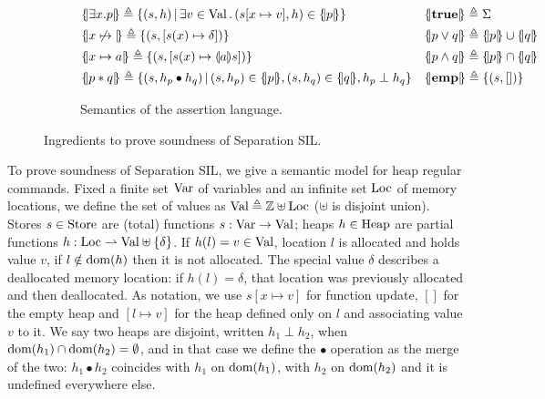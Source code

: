 \begin{figure}[t]
\begin{subfigure}[t]{\linewidth}
\begin{align*}
			 & \asldenot{\exists x. p} \eqdef \{ (s, h) \svert \exists v \in \Val \sdot (s[x \mapsto v], h) \in \asldenot{p} \}                   &  & \asldenot{\true} \eqdef \Sigma                             \\
			 & \asldenot{x \dealloc} \eqdef \{ (s, [s(x) \mapsto \delta]) \}                                                                      &  & \asldenot{p \lor q} \eqdef \asldenot{p} \cup \asldenot{q}  \\
			 & \asldenot{x \mapsto a} \eqdef \{ (s, [s(x) \mapsto \edenot{a} s]) \}                                                               &  & \asldenot{p \land q} \eqdef \asldenot{p} \cap \asldenot{q} \\
			 & \asldenot{p \andsep q} \eqdef \{ (s, h_p \bullet h_q) \svert (s, h_p) \in \asldenot{p}, (s,h_q) \in \asldenot{q}, h_p \perp h_q \} &  & \asldenot{\emp} \eqdef \{ (s, []) \}
		\end{align*}
		\caption{Semantics of the assertion language.}
		\label{fig:sil:ssil-model-assertions}
	\end{subfigure}
	\caption{Ingredients to prove soundness of Separation SIL.}
\end{figure}

To prove soundness of Separation SIL, we give a semantic model for heap regular commands.
Fixed a finite set $\text{Var}$ of variables and an infinite set $\text{Loc}$ of memory locations, we define the set of values as $\text{Val} \triangleq \mathbb{Z} \uplus \text{Loc}$ ($\uplus$ is disjoint union).
Stores $s \in \text{Store}$ are (total) functions $s: \text{Var} \rightarrow \text{Val}$; heaps $h \in \text{Heap}$ are partial functions $h: \text{Loc} \rightharpoonup \text{Val} \uplus \{ \delta \}$. If $h(l) = v \in \text{Val}$, location $l$ is allocated and holds value $v$, if $l \notin \text{dom}(h)$ then it is not allocated. The special value $\delta$ describes a deallocated memory location: if $h(l) = \delta$, that location was previously allocated and then deallocated.
As notation, we use $s[x \mapsto v]$ for function update, $[]$ for the empty heap and $[l \mapsto v]$ for the heap defined only on $l$ and associating value $v$ to it.
We say two heaps are disjoint, written $h_1 \perp h_2$, when $\text{dom}(h_1) \cap \text{dom}(h_2) = \emptyset$, and in that case we define the $\bullet$ operation as the merge of the two: $h_1 \bullet h_2$ coincides with $h_1$ on $\text{dom}(h_1)$, with $h_2$ on $\text{dom}(h_2)$ and it is undefined everywhere else.

